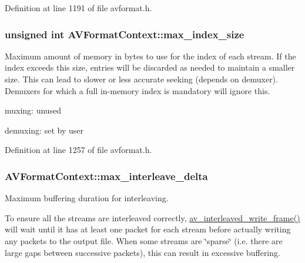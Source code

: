 Definition at line 1191 of file avformat.\+h.

\subsubsection[{\texorpdfstring{max\+\_\+index\+\_\+size}{max_index_size}}]{\setlength{\rightskip}{0pt plus 5cm}unsigned {\bf int} A\+V\+Format\+Context\+::max\+\_\+index\+\_\+size}\hypertarget{struct_a_v_format_context_ab0470d586a71d4f356194d202591617d}{}\label{struct_a_v_format_context_ab0470d586a71d4f356194d202591617d}
Maximum amount of memory in bytes to use for the index of each stream. If the index exceeds this size, entries will be discarded as needed to maintain a smaller size. This can lead to slower or less accurate seeking (depends on demuxer). Demuxers for which a full in-\/memory index is mandatory will ignore this.
\begin{DoxyItemize}
\item muxing\+: unused
\item demuxing\+: set by user 
\end{DoxyItemize}

Definition at line 1257 of file avformat.\+h.

\subsubsection[{\texorpdfstring{max\+\_\+interleave\+\_\+delta}{max_interleave_delta}}]{ A\+V\+Format\+Context\+::max\+\_\+interleave\+\_\+delta}\hypertarget{struct_a_v_format_context_a00edb6b7a31f8dabfa668334ca1f92d7}{}\label{struct_a_v_format_context_a00edb6b7a31f8dabfa668334ca1f92d7}
Maximum buffering duration for interleaving.

To ensure all the streams are interleaved correctly, \hyperlink{group__lavf__encoding_ga37352ed2c63493c38219d935e71db6c1}{av\+\_\+interleaved\+\_\+write\+\_\+frame()} will wait until it has at least one packet for each stream before actually writing any packets to the output file. When some streams are \char`\"{}sparse\char`\"{} (i.\+e. there are large gaps between successive packets), this can result in excessive buffering.

